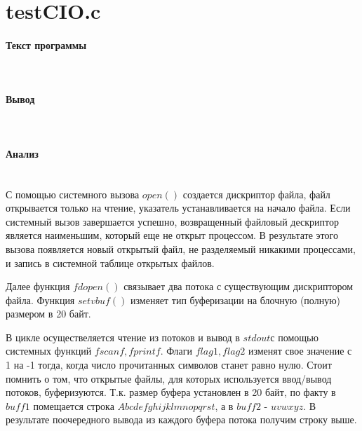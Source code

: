 \section{testCIO.c}

\paragraph{Текст программы}\hfill\\



\paragraph{Вывод}\hfill\\


\paragraph{Анализ}\hfill\\
 С помощью системного вызова $open()$ создается дискриптор файла, файл открывается только на чтение, указатель устанавливается на начало файла. Если системный вызов завершается успешно, возвращенный файловый дескриптор является наименьшим, который еще не открыт процессом. В результате этого вызова появляется новый открытый файл, не разделяемый никакими процессами, и запись в системной таблице открытых файлов. 
 
 Далее функция $fdopen()$ связывает два потока с существующим дискриптором файла. Функция $setvbuf()$ изменяет тип буферизации на блочную (полную) размером в 20 байт. 
 
 В цикле осуществеляется чтение из потоков и вывод в $stdout$с помощью системных функций $fscanf, fprintf$. Флаги $flag1, flag2$ изменят свое значение с 1 на -1 тогда, когда число прочитанных символов станет равно нулю. Стоит помнить о том, что открытые файлы, для которых используется ввод/вывод потоков, буферизуются. Т.к. размер буфера установлен в 20 байт, по факту в $buff1$ помещается строка $Abcdefghijklmnopqrst$, а в $buff2$ - $uvwxyz$. В результате поочередного вывода из каждого буфера потока получим строку выше.

